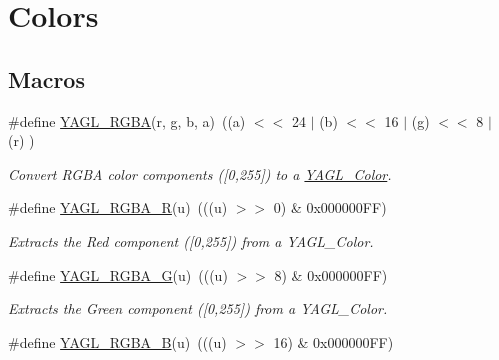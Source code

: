 \hypertarget{group____consts__color}{\section{Colors}
\label{group____consts__color}
}
\subsection*{Macros}
\begin{DoxyCompactItemize}
\item 
\#define \hyperlink{group____consts__color_gafb7bac2b0520a9c7909a92f19101ee2c}{Y\-A\-G\-L\-\_\-\-R\-G\-B\-A}(r, g, b, a)~((a) $<$$<$ 24 $|$ (b) $<$$<$ 16 $|$ (g) $<$$<$ 8 $|$ (r) )
\begin{DoxyCompactList}\small\item\em Convert R\-G\-B\-A color components (\mbox{[}0,255\mbox{]}) to a \hyperlink{group____consts__color_gafe1825ea3ea95c415448a35dc1f1418d}{Y\-A\-G\-L\-\_\-\-Color}. \end{DoxyCompactList}\item 
\hypertarget{group____consts__color_ga9735b680ee349476ed233663ee56ae7e}{\#define \hyperlink{group____consts__color_ga9735b680ee349476ed233663ee56ae7e}{Y\-A\-G\-L\-\_\-\-R\-G\-B\-A\-\_\-\-R}(u)~(((u) $>$$>$ 0)  \& 0x000000\-F\-F)}\label{group____consts__color_ga9735b680ee349476ed233663ee56ae7e}

\begin{DoxyCompactList}\small\item\em Extracts the Red component (\mbox{[}0,255\mbox{]}) from a Y\-A\-G\-L\-\_\-\-Color. \end{DoxyCompactList}\item 
\hypertarget{group____consts__color_ga09c5fb4d22228f92c3fa98f5b550730f}{\#define \hyperlink{group____consts__color_ga09c5fb4d22228f92c3fa98f5b550730f}{Y\-A\-G\-L\-\_\-\-R\-G\-B\-A\-\_\-\-G}(u)~(((u) $>$$>$ 8)  \& 0x000000\-F\-F)}\label{group____consts__color_ga09c5fb4d22228f92c3fa98f5b550730f}

\begin{DoxyCompactList}\small\item\em Extracts the Green component (\mbox{[}0,255\mbox{]}) from a Y\-A\-G\-L\-\_\-\-Color. \end{DoxyCompactList}\item 
\hypertarget{group____consts__color_ga7b84923243e2a15f03f63e25382d3b57}{\#define \hyperlink{group____consts__color_ga7b84923243e2a15f03f63e25382d3b57}{Y\-A\-G\-L\-\_\-\-R\-G\-B\-A\-\_\-\-B}(u)~(((u) $>$$>$ 16) \& 0x000000\-F\-F)}\label{group____consts__color_ga7b84923243e2a15f03f63e25382d3b57}


\end{DoxyCompactItemize}
